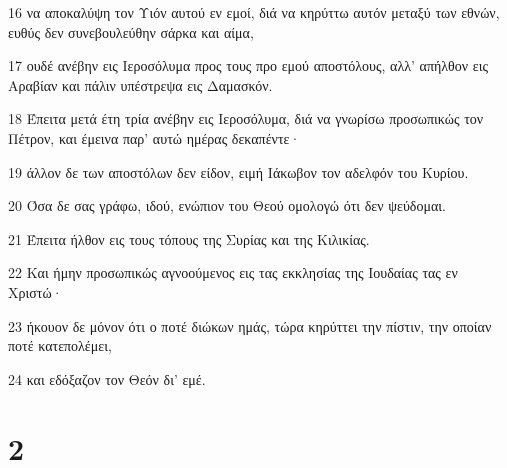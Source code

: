 \par 16 να αποκαλύψη τον Υιόν αυτού εν εμοί, διά να κηρύττω αυτόν μεταξύ των εθνών, ευθύς δεν συνεβουλεύθην σάρκα και αίμα,
\par 17 ουδέ ανέβην εις Ιεροσόλυμα προς τους προ εμού αποστόλους, αλλ' απήλθον εις Αραβίαν και πάλιν υπέστρεψα εις Δαμασκόν.
\par 18 Έπειτα μετά έτη τρία ανέβην εις Ιεροσόλυμα, διά να γνωρίσω προσωπικώς τον Πέτρον, και έμεινα παρ' αυτώ ημέρας δεκαπέντε·
\par 19 άλλον δε των αποστόλων δεν είδον, ειμή Ιάκωβον τον αδελφόν του Κυρίου.
\par 20 Όσα δε σας γράφω, ιδού, ενώπιον του Θεού ομολογώ ότι δεν ψεύδομαι.
\par 21 Έπειτα ήλθον εις τους τόπους της Συρίας και της Κιλικίας.
\par 22 Και ήμην προσωπικώς αγνοούμενος εις τας εκκλησίας της Ιουδαίας τας εν Χριστώ·
\par 23 ήκουον δε μόνον ότι ο ποτέ διώκων ημάς, τώρα κηρύττει την πίστιν, την οποίαν ποτέ κατεπολέμει,
\par 24 και εδόξαζον τον Θεόν δι' εμέ.

\chapter{2}

